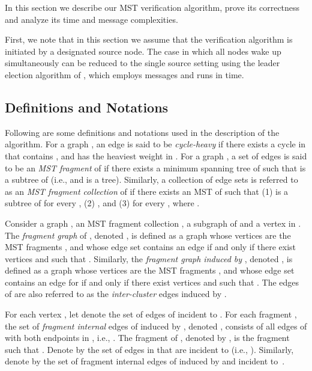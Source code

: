 \documentclass[11pt,letter]{article}
\begin{document}
In this section we describe our MST verification algorithm, 
prove its correctness and analyze its time and message complexities.

First, we note that in this section we assume that the verification algorithm 
is initiated by a designated source node. The case in which all nodes wake up 
simultaneously can be reduced to the single source setting using the 
leader election algorithm of \cite{KPPRT12}, which employs  
messages and runs in  time.

\subsection{Definitions and Notations}

Following are some definitions and notations used in the description 
of the algorithm.
For a graph , an edge  is said to be {\em cycle-heavy} 
if there exists a cycle  in  that contains , and  has 
the heaviest weight in .
For a graph , a set of edges  is said to be an 
{\em MST fragment} of  if there exists a minimum spanning tree  
of  such that  is a subtree of  
(i.e.,  and  is a tree). 
Similarly, a collection   of edge sets is referred to as an 
{\em MST fragment collection} 
of  if there exists an MST   of  
such that 
(1)  is a subtree of   for every ,
(2) ,
and 
(3)  for every , where .

Consider a graph , an MST fragment collection ,
a subgraph  of  and a vertex  in .
The {\em fragment graph} of , denoted , is defined as a graph 
whose vertices are the MST fragments , and whose edge set contains 
an edge   if and only if there exist vertices  and  
such that . Similarly,
the {\em fragment graph induced by} , denoted ,  
is defined as a graph whose vertices are the MST fragments , 
and whose edge set contains an edge  for   if and only if there exist vertices 
 and  such that . The edges of  
are also referred to as the {\em inter-cluster} edges induced by .

For each vertex , let  denote the set of edges of  incident to .
For each fragment , the set of {\em fragment internal} 
edges of  induced by , denoted , consists of all edges of  with both 
endpoints in , i.e., 
.
The fragment of , denoted by , is the fragment 
 such that .
Denote by  the set of edges in  that are incident to  
(i.e., ).
Similarly, denote by  the set of fragment internal edges of  induced by  
and incident to~.
\end{document}
